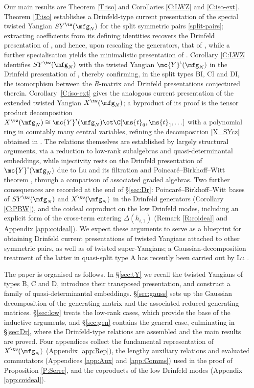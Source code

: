 \documentclass{amsart}
\numberwithin{equation}{section}
\theoremstyle{remark}
\renewcommand{\,}{\kern 0.1em} %
\begin{document}
Our main results are Theorem \ref{T:iso} and Corollaries \ref{C:LWZ} and \ref{C:iso-ext}. Theorem \ref{T:iso} establishes a Drinfeld-type current presentation of the special twisted Yangian $SY^{\tw}(\mfg_N)$ for the split symmetric pairs \eqref{split-pairs}; extracting coefficients from its defining identities recovers the Drinfeld presentation of \cite[Def.~2.7]{Lu26a}, and hence, upon rescaling the generators, that of \cite[Def.~4.1]{LWZ25b}, while a further specialisation yields the minimalistic presentation of \cite[Thm.~3.1]{Lu26a}. Corollary \ref{C:LWZ} identifies $SY^{\tw}(\mfg_N)$ with the twisted Yangian $\mc{Y}^{\imath}(\mfg_N)$ in the Drinfeld presentation of \cite{LWZ25b}, thereby confirming, in the split types BI, CI and DI, the isomorphism between the $R$-matrix and Drinfeld presentations conjectured therein. Corollary~\ref{C:iso-ext} gives the analogous current presentation of the extended twisted Yangian $X^{\tw}(\mfg_N)$; a byproduct of its proof is the tensor product decomposition $X^{\tw}(\mfg_N) \cong \mc{Y}^{\imath}(\mfg_N) \ot \C[\ms{t}_0, \ms{t}_1, \ldots]$ with a polynomial ring in countably many central variables, refining the decomposition \eqref{X=SYcz} obtained in \cite{GR16}. The relations themselves are established by largely structural arguments, via a reduction to low-rank subalgebras and quasi-determinantal embeddings, while injectivity rests on the Drinfeld presentation of $\mc{Y}^{\imath}(\mfg_N)$ due to Lu \cite{Lu26a} and its filtration and Poincar\'e--Birkhoff--Witt theorem \cite{LWZ25b}, through a comparison of associated graded algebras. Two further consequences are recorded at the end of \S\ref{sec:Dr}: Poincar\'e--Birkhoff--Witt bases of $SY^{\tw}(\mfg_N)$ and $X^{\tw}(\mfg_N)$ in the Drinfeld generators (Corollary \ref{C:PBW}), and the coideal coproduct on the low Drinfeld modes, including an explicit form of the cross-term entering $\Delta(h_{i,1})$ (Remark \ref{R:coideal} and Appendix \ref{app:coideal}). We expect these arguments to serve as a blueprint for obtaining Drinfeld current presentations of twisted Yangians attached to other symmetric pairs, as well as of twisted super-Yangians; a Gaussian-decomposition treatment of the latter in quasi-split type A has recently been carried out by Lu \cite{Lu26b}.

The paper is organised as follows. In \S\ref{sec:tY} we recall the twisted Yangians of types B, C and D, introduce their transposed presentation, and construct a family of quasi-determinantal embeddings. \S\ref{sec:gauss} sets up the Gaussian decomposition of the generating matrix and the associated reduced generating matrices. \S\ref{sec:low} treats the low-rank cases, which provide the base of the inductive arguments, and \S\ref{sec:gen} contains the general case, culminating in \S\ref{sec:Dr}, where the Drinfeld-type relations are assembled and the main results are proved. Four appendices collect the fundamental representation of $X^{\tw}(\mfg_N)$ (Appendix \ref{app:Rep}), the lengthy auxiliary relations and evaluated commutators (Appendices \ref{app:Aux} and \ref{app:Comms}) used in the proof of Proposition \ref{P:Serre}, and the coproducts of the low Drinfeld modes (Appendix \ref{app:coideal}). 
\end{document}
